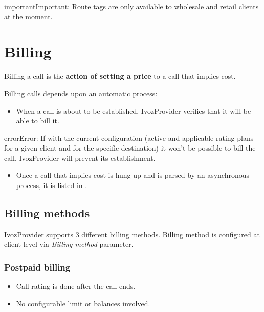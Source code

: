\documentclass[letterpaper,10pt,english]{sphinxmanual}
\begin{document}
\begin{notice}{important}{Important:}
Route tags are only available to wholesale and retail clients at the moment.
\end{notice}


\section{Billing}
\label{administration_portal/brand/billing/index::doc}\label{administration_portal/brand/billing/index:billing}\label{administration_portal/brand/billing/index:id1}
Billing a call is the \textbf{action of setting a price} to a call that implies cost.

Billing calls depends upon an automatic process:
\begin{itemize}
\item {} 
When a call is about to be established, IvozProvider verifies that it will be able to bill it.

\end{itemize}

\begin{notice}{error}{Error:}
If with the current configuration (active and applicable rating plans for
a given client and for the specific destination) it won't be possible to
bill the call, IvozProvider will prevent its establishment.
\end{notice}
\begin{itemize}
\item {} 
Once a call that implies cost is hung up and is parsed by an asynchronous process, it is listed in {\hyperref[administration_portal/platform/external_calls:id1]{}}.

\end{itemize}


\subsection{Billing methods}
\label{administration_portal/brand/billing/index:billing-methods}
IvozProvider supports 3 different billing methods. Billing method is configured at client level via \emph{Billing method} parameter.


\subsubsection{Postpaid billing}
\label{administration_portal/brand/billing/index:postpaid-billing}\label{administration_portal/brand/billing/index:id2}\begin{itemize}
\item {} 
Call rating is done after the call ends.

\item {} 
No configurable limit or balances involved.

\end{itemize}
\end{document}
